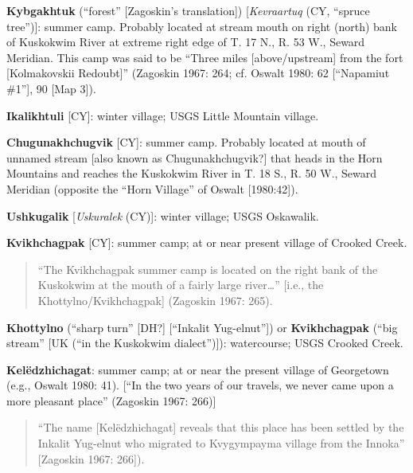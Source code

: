 \begin{hang}

\textbf{Kybgakhtuk} (“forest” [Zagoskin’s translation]) [\textit{Kevraartuq} (CY, “spruce tree”)]: summer camp. Probably located at stream mouth on right (north) bank of Kuskokwim River at extreme right edge of T. 17 N., R. 53 W., Seward Meridian. This camp was said to be “Three miles [above/upstream] from the fort [Kolmakovskii Redoubt]” (Zagoskin 1967: 264; cf. Oswalt 1980: 62 [“Napamiut \#1”], 90 [Map 3]).



\textbf{Ikalikhtuli} [CY]: winter village; USGS Little Mountain village.



\textbf{Chugunakhchugvik} [CY]: summer camp. Probably located at mouth of unnamed stream [also known as Chugunakhchugvik?] that heads in the Horn Mountains and reaches the Kuskokwim River in T. 18 S., R. 50 W., Seward Meridian (opposite the “Horn Village” of Oswalt [1980:42]).



\textbf{Ushkugalik} [\textit{Uskuralek} (CY)]: winter village; USGS Oskawalik.



\textbf{Kvikhchagpak} [CY]: summer camp; at or near present village of Crooked Creek.



\begin{quote}“The Kvikhchagpak summer camp is located on the right bank of the Kuskokwim at the mouth of a fairly large river…” [i.e., the Khottylno/Kvikhchagpak] (Zagoskin 1967: 265).
\end{quote}



\textbf{Khottylno} (“sharp turn” [DH?] [“Inkalit Yug-elnut”]) or \textbf{Kvikhchagpak} (“big stream” [UK (“in the Kuskokwim dialect”)]): watercourse; USGS Crooked Creek.



\textbf{Kelëdzhichagat}: summer camp; at or near the present village of Georgetown (e.g., Oswalt 1980: 41). [“In the two years of our travels, we never came upon a more pleasant place” (Zagoskin 1967: 266)]



\begin{quote}“The name [Kelëdzhichagat] reveals that this place has been settled by the Inkalit Yug-elnut who migrated to Kvygympayma village from the Innoka” [Zagoskin 1967: 266]).
\end{quote}


\end{hang}

